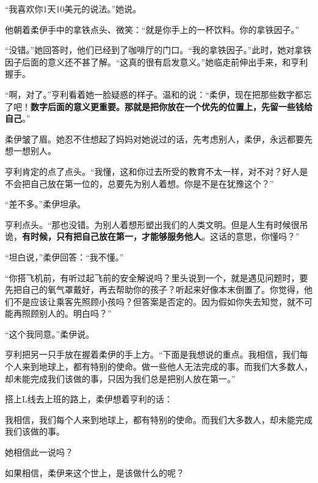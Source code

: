“我喜欢你1天10美元的说法。”她说。

他朝着柔伊手中的拿铁点头、微笑：“就是你手上的一杯饮料。你的拿铁因子。”

“没错。”她回答时，他们已经到了咖啡厅的门口。“我的拿铁因子。”此时，她对拿铁因子后面的意义还不甚了解。“这真的很有启发意义。”她临走前伸出手来，和亨利握手。

“啊，对了。”亨利看着她一脸疑惑的样子。温和的说：“柔伊，现在把那些数字都忘了吧！\textbf{数字后面的意义更重要。那就是把你放在一个优先的位置上，先留一些钱给自己}。”

柔伊皱了眉。她忍不住想起了妈妈对她说过的话，先考虑别人，柔伊，永远都要先想一想别人。

亨利肯定的点了点头。“我懂，这和你过去所受的教育不太一样，对不对？好人是不会把自己放在第一位的，总要先为别人着想。你是不是在犹豫这个？”

“差不多。”柔伊坦承。

亨利点头。“那也没错。为别人着想形塑出我们的人类文明。但是人生有时候很吊诡，\textbf{有时候，只有把自己放在第一，才能够服务他人}。这话的意思，你懂吗？”

“坦白说，”柔伊回答：“我不懂。”

“你搭飞机前，有听过起飞前的安全解说吗？里头说到一个，就是遇见问题时，要先把自己的氧气罩戴好，再去帮助你的孩子？听起来好像本末倒置了。你觉得，他们不是应该让乘客先照顾小孩吗？但答案是否定的。因为假如你失去知觉，就不可能再照顾别人的。明白吗？”

“这个我同意。”柔伊说。

亨利把另一只手放在握着柔伊的手上方。“下面是我想说的重点。我相信，我们每个人来到地球上，都有特别的使命。做一些他人无法完成的事。而我们大多数人，却未能完成我们该做的事，只因为我们总是把别人放在第一。”

搭上L线去上班的路上，柔伊想着亨利的话：

{\kaishu 我相信，我们每个人来到地球上，都有特别的使命。而我们大多数人，却未能完成我们该做的事。}

她相信此一说吗？

如果相信，柔伊来这个世上，是该做什么的呢？
